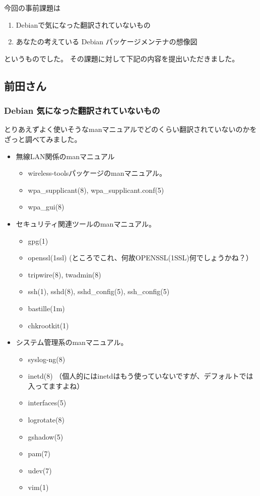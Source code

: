 \documentclass[mingoth,a4paper]{jsarticle}
\begin{document}

今回の事前課題は
\begin{enumerate}
\item Debianで気になった翻訳されていないもの
\item あなたの考えている Debian パッケージメンテナの想像図
\end{enumerate}

というものでした。
その課題に対して下記の内容を提出いただきました。

\subsection{前田さん}
\subsubsection{Debian 気になった翻訳されていないもの}
とりあえずよく使いそうなmanマニュアルでどのくらい翻訳されていないのかをざっと調べてみました。
\begin{itemize}
  \item 無線LAN関係のmanマニュアル
    \begin{itemize}
      \item wireless-toolsパッケージのmanマニュアル。
      \item wpa\_supplicant(8), wpa\_supplicant.conf(5)
      \item wpa\_gui(8)
    \end{itemize}

  \item セキュリティ関連ツールのmanマニュアル。
    \begin{itemize}
      \item gpg(1)
      \item openssl(1ssl) (ところでこれ、何故OPENSSL(1SSL)何でしょうかね？）
      \item tripwire(8), twadmin(8)
      \item ssh(1), sshd(8), sshd\_config(5), ssh\_config(5)
      \item bastille(1m)
      \item chkrootkit(1)
    \end{itemize}
  \item システム管理系のmanマニュアル。
    \begin{itemize}
      \item syslog-ng(8)
      \item inetd(8) （個人的にはinetdはもう使っていないですが、デフォルトでは入ってますよね）
      \item interfaces(5)
      \item logrotate(8)
      \item gshadow(5)
      \item pam(7)
      \item udev(7)
      \item vim(1)
    \end{itemize}
\end{itemize}
\end{document}
